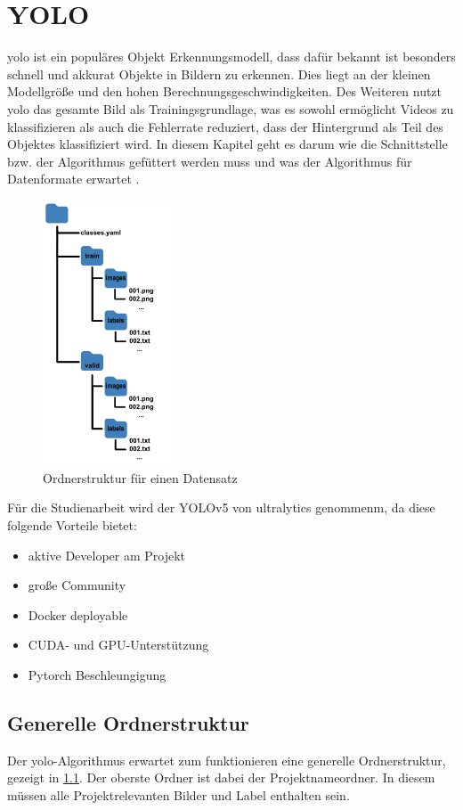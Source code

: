 \chapter{YOLO}
\ac{yolo} ist ein populäres Objekt Erkennungsmodell, dass dafür bekannt ist besonders schnell und akkurat Objekte in Bildern zu erkennen. Dies liegt an der kleinen Modellgröße und den hohen Berechnungsgeschwindigkeiten. Des Weiteren nutzt \ac{yolo} das gesamte Bild als Trainingsgrundlage, was es sowohl ermöglicht Videos zu klassifizieren als auch die Fehlerrate reduziert, dass der Hintergrund als Teil des Objektes klassifiziert wird. In diesem Kapitel geht es darum wie die Schnittstelle bzw. der Algorithmus gefüttert werden muss und was der Algorithmus für Datenformate erwartet \cite{Jiang.2022}.

\begin{figure}
    \includegraphics[width=4cm]{data/img/ordnerstruktur_yolo.png}
    \caption{Ordnerstruktur für einen Datensatz}
    \label{fig:folderYolo}
\end{figure}

Für die Studienarbeit wird der YOLOv5 von ultralytics \cite{glennjocher.2023} genommenm, da diese folgende Vorteile bietet:
\begin{itemize}
    \item aktive Developer am Projekt
    \item große Community 
    \item Docker deployable
    \item CUDA- und GPU-Unterstützung
    \item Pytorch Beschleungigung
\end{itemize}


\section{Generelle Ordnerstruktur}
Der \ac{yolo}-Algorithmus erwartet zum funktionieren eine generelle Ordnerstruktur, gezeigt in \ref{fig:folderYolo}. Der oberste Ordner ist dabei der Projektnameordner. In diesem müssen alle Projektrelevanten Bilder und Label enthalten sein. 

